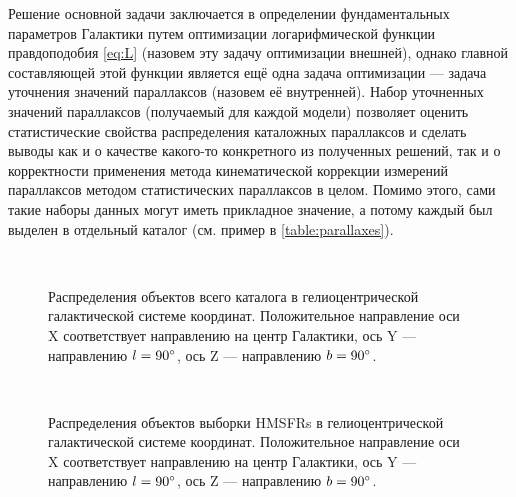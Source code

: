 \documentclass[a4paper, oneside, 14pt]{article}
\begin{document}
Решение основной задачи заключается в определении фундаментальных параметров Галактики путем оптимизации логарифмической функции правдоподобия \eqref{eq:L} (назовем эту задачу оптимизации внешней), однако главной составляющей этой функции является ещё одна задача оптимизации --- задача уточнения значений параллаксов (назовем её внутренней). Набор уточненных значений параллаксов (получаемый для каждой модели) позволяет оценить статистические свойства распределения каталожных параллаксов и сделать выводы как и о качестве какого-то конкретного из полученных решений, так и о корректности применения метода кинематической коррекции измерений параллаксов методом статистических параллаксов в целом. Помимо этого, сами такие наборы данных могут иметь прикладное значение, а потому каждый был выделен в отдельный каталог (см. пример в \autoref{table:parallaxes}).



\clearpage



\begin{figure}[p!]
  \centering
  \\
  \caption{Распределения объектов всего каталога в гелиоцентрической галактической системе координат. Положительное направление оси X соответствует направлению на центр Галактики, ось Y --- направлению $ l = 90\degree $, ось Z --- направлению $ b = 90\degree$.}
  \label{fig:all_xyz}
\end{figure}

\begin{figure}[p!]
  \centering
  \\
  \caption{Распределения объектов выборки HMSFRs в гелиоцентрической галактической системе координат. Положительное направление оси X соответствует направлению на центр Галактики, ось Y --- направлению $ l = 90\degree $, ось Z --- направлению $ b = 90\degree$.}
  \label{fig:hmsfrs_xyz}
\end{figure}
\end{document}
